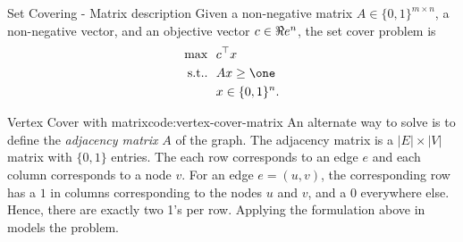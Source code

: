 

%

\begin{general}{Set Covering - Matrix description}{\npcomplete}
\label{general:set-covering-alternate}
Given a non-negative matrix $A \in \{0,1\}^{m \times n}$, a non-negative vector, and an objective vector $c \in \Re e^n$, the set cover problem is
\begin{equation}
\begin{split}
\max \ \ & c^\top x\\
\text{s.t.}. \ \ & Ax \geq \one \\
& x \in \{0,1\}^n.
\end{split}
\end{equation}
\end{general}
\begin{examplewithoutcode}{Vertex Cover with matrix}{code:vertex-cover-matrix}
An alternate way to solve  is to define the \emph{adjacency matrix} $A$ of the graph.  The adjacency matrix is a $|E| \times |V|$ matrix with $\{0,1\}$ entries.  The each row corresponds to an edge $e$ and each column corresponds to a node $v$.  For an edge $e = (u,v)$, the corresponding row has a $1$ in columns corresponding to the nodes $u$ and $v$, and a 0 everywhere else.  Hence, there are exactly two 1's per row.  Applying the formulation above in  models the problem.
\end{examplewithoutcode}




%

